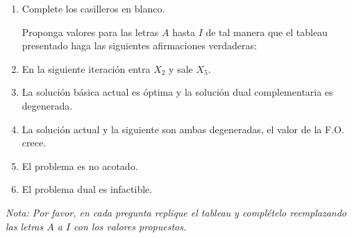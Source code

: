 \documentclass[12pt]{article}
\theoremstyle{plain}
\begin{document}
\begin{enumerate}[label=\alph*)]
      \item Complete los casilleros en blanco.

            Proponga valores para las letras $A$ hasta $I$ de tal manera que el tableau
            presentado haga las siguientes afirmaciones verdaderas:

      \item En la siguiente iteración entra $X_2$ y sale $X_5$.

      \item La solución básica actual es óptima y la solución dual complementaria es
            degenerada.

      \item La solución actual y la siguiente son ambas degeneradas, el valor de la F.O.
            crece.

      \item El problema es no acotado.

      \item El problema dual es infactible.
\end{enumerate}

\noindent\textit{Nota: Por favor, en cada pregunta replique el tableau y complételo
reemplazando las letras $A$ a $I$ con los valores propuestos.}
\end{document}
